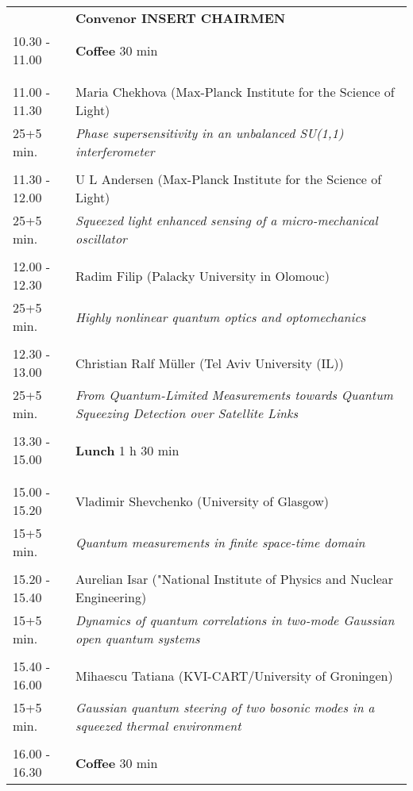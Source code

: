\begin{longtable}{p{3cm}p{13cm}}
&\hfill {\bf Convenor INSERT CHAIRMEN }\\ 
10.30 - 11.00 & {\bf Coffee} \hfill 30 min \\ 
 & \\ 
 & \\ 
11.00 - 11.30 & Maria Chekhova (Max-Planck Institute for the Science of Light)\\ 
25+5 min. & {\it Phase supersensitivity in an unbalanced SU(1,1) interferometer}\\ 
 & \\ 
11.30 - 12.00 & U L Andersen (Max-Planck Institute for the Science of Light)\\ 
25+5 min. & {\it Squeezed light enhanced sensing of a micro-mechanical oscillator}\\ 
 & \\ 
12.00 - 12.30 & Radim Filip (Palacky University in Olomouc)\\ 
25+5 min. & {\it Highly nonlinear quantum optics and optomechanics}\\ 
 & \\ 
12.30 - 13.00 & Christian Ralf Müller (Tel Aviv University (IL))\\ 
25+5 min. & {\it From Quantum-Limited Measurements towards Quantum Squeezing Detection over Satellite Links}\\ 
 & \\ 
13.30 - 15.00 & {\bf Lunch} \hfill 1 h 30 min \\ 
 & \\ 
 & \\ 
15.00 - 15.20 & Vladimir Shevchenko (University of Glasgow)\\ 
15+5 min. & {\it Quantum measurements in finite space-time domain}\\ 
 & \\ 
15.20 - 15.40 & Aurelian Isar ("National Institute of Physics and Nuclear Engineering)\\ 
15+5 min. & {\it Dynamics of quantum correlations in two-mode Gaussian open quantum systems}\\ 
 & \\ 
15.40 - 16.00 & Mihaescu Tatiana (KVI-CART/University of Groningen)\\ 
15+5 min. & {\it Gaussian quantum steering of two bosonic modes in a squeezed thermal environment}\\ 
 & \\ 
16.00 - 16.30 & {\bf Coffee} \hfill 30 min \\ 

\end{longtable}
